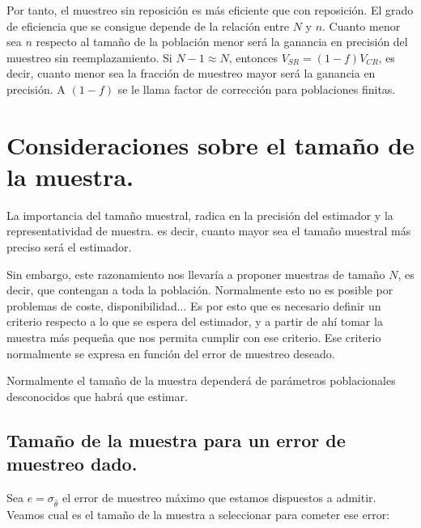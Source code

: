 Por tanto, el muestreo sin reposici\'on es m\'as eficiente que con reposici\'on.
El grado de eficiencia que se consigue depende de la relaci\'on entre
$N$ y $n$. Cuanto menor sea $n$ respecto al tama\~no de la poblaci\'on
menor ser\'a la ganancia en precisi\'on del muestreo sin reemplazamiento.
Si $N-1\approx N$, entonces $V_{SR}=\left(1-f\right)V_{CR}$, es
decir, cuanto menor sea la fracci\'on de muestreo mayor ser\'a la ganancia
en precisi\'on. A $\left(1-f\right)$ se le llama factor de correcci\'on
para poblaciones finitas.


\section{Consideraciones sobre el tama\~no de la muestra.}

La importancia del tama\~no muestral, radica en la precisi\'on del estimador
y la representatividad de muestra. es decir, cuanto mayor sea el tama\~no
muestral m\'as preciso ser\'a el estimador.

Sin embargo, este razonamiento nos llevar\'ia a proponer muestras de
tama\~no $N$, es decir, que contengan a toda la poblaci\'on. Normalmente
esto no es posible por problemas de coste, disponibilidad... Es por
esto que es necesario definir un criterio respecto a lo que se espera
del estimador, y a partir de ah\'i tomar la muestra m\'as peque\~na que
nos permita cumplir con ese criterio. Ese criterio normalmente se
expresa en funci\'on del error de muestreo deseado.

Normalmente el tama\~no de la muestra depender\'a de par\'ametros poblacionales
desconocidos que habr\'a que estimar.


\subsection{Tama\~no de la muestra para un error de muestreo dado.}

Sea $e=\sigma_{\hat{\theta}}$ el error de muestreo m\'aximo que estamos
dispuestos a admitir. Veamos cual es el tama\~no de la muestra a seleccionar
para cometer ese error:


